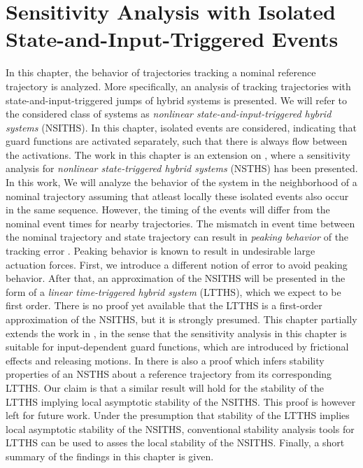 \documentclass[../DC2017114Bouma.tex]{subfiles}
\begin{document}
\graphicspath{{03_Contribution/img/}}
\renewcommand{\chaptermark}[1]{\markboth{\thechapter.\ #1}{}}
\renewcommand{\sectionmark}[1]{\markright{#1}{}}

\pagestyle{fancyreport}
\cleartooddpage
\pagestyle{fancyreport}
\chapter{Sensitivity Analysis with Isolated State-and-Input-Triggered Events}\label{ch:order}
In this chapter, the behavior of trajectories tracking a nominal reference trajectory is analyzed. More specifically, an analysis of tracking trajectories with state-and-input-triggered jumps of hybrid systems is presented. We will refer to the considered class of systems as \textit{nonlinear state-and-input-triggered hybrid systems} (NSITHS). In this chapter, isolated events are considered, indicating that guard functions are activated separately, such that there is always flow between the activations. The work in this chapter is an extension on \cite{Saccon2014,Rijnen2017,Rijnen2018a}, where a sensitivity analysis for \textit{nonlinear state-triggered hybrid systems} (NSTHS) has been presented. In this work, We will analyze the behavior of the system in the neighborhood of a nominal trajectory assuming that atleast locally these isolated events also occur in the same sequence. However, the timing of the events will differ from the nominal event times for nearby trajectories. The mismatch in event time between the nominal trajectory and state trajectory can result in \textit{peaking behavior} of the tracking error \cite{Menini2001,Biemond2013}. Peaking behavior is known to result in undesirable large actuation forces. First, we introduce a different notion of error to avoid peaking behavior. After that, an approximation of the NSITHS will be presented in the form of a \textit{linear time-triggered hybrid system} (LTTHS), which we expect to be first order. There is no proof yet available that the LTTHS is a first-order approximation of the NSITHS, but it is strongly presumed. This chapter partially extends the work in \cite{Rijnen2017}, in the sense that the sensitivity analysis in this chapter is suitable for input-dependent guard functions, which are introduced by frictional effects and releasing motions. In \cite{Rijnen2017} there is also a proof which infers stability properties of an NSTHS about a reference trajectory from its corresponding LTTHS. Our claim is that a similar result will hold for the stability of the LTTHS implying local asymptotic stability of the NSITHS. This proof is however left for future work. Under the presumption that stability of the LTTHS implies local asymptotic stability of the NSITHS, conventional stability analysis tools for LTTHS can be used to asses the local stability of the NSITHS. Finally, a short summary of the findings in this chapter is given.
%
%
\end{document}
